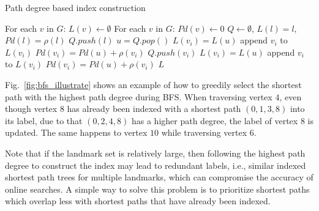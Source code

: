 \begin{algorithm}
    \caption{Path degree based index construction}
		\label{alg:index_construct}
    \begin{algorithmic}
						\State For each $v$ in $G$: $L(v) \gets \emptyset$
						\State For each $v$ in $G$: $Pd(v) \gets 0$
						\State $Q \gets \emptyset$, $L(l) = l$, $Pd(l) = \rho(l)$ 
						\State $Q.push(l)$
								\State $u = Q.pop()$
												\State $L(v_i) = L(u)$
												\State append $v_i$ to $L(v_i)$
												\State $Pd(v_i) = Pd(u) + \rho(v_i)$
												\State $Q.push(v_i)$
												\State $L(v_i) = L(u)$
												\State append $v_i$ to $L(v_i)$
												\State $Pd(v_i) = Pd(u) + \rho(v_i)$
										\EndIf
								\EndFor
						\EndWhile
						\State \Return $L$
        \EndFunction
    \end{algorithmic}
\end{algorithm}

Fig.~\ref{fig:bfs_illustrate} shows an example of how to greedily select the shortest path with the highest path degree during BFS. When traversing vertex $4$, even though vertex $8$ has already been indexed with a shortest path $(0, 1, 3, 8)$ into its label, due to that $(0, 2, 4, 8)$ has a higher path degree, the label of vertex $8$ is updated. The same happens to vertex $10$ while traversing vertex $6$. 

Note that if the landmark set is relatively large, then following the highest path degree to construct the index may lead to redundant labels, i.e., similar indexed shortest path trees for multiple landmarks, which can compromise the accuracy of online searches. A simple way to solve this problem is to prioritize shortest paths which overlap less with shortest paths that have already been indexed.